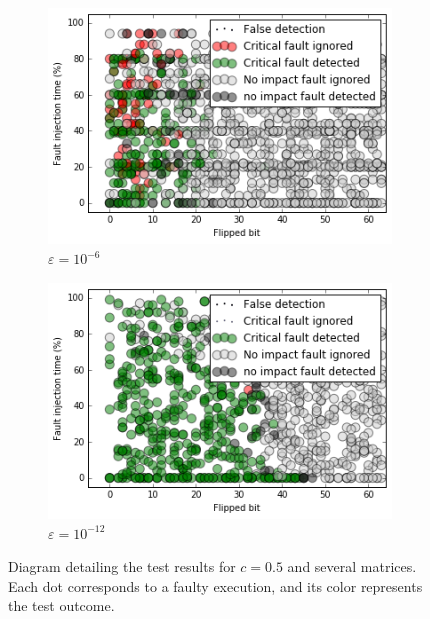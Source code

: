 \documentclass[twoside]{article}
\newcounter{fig}\setcounter{fig}{0}
\begin{document}
\begin{figure}[H]
\begin{minipage}[b]{0.48\linewidth}
      \begin{subfigure}[t]{\linewidth}
        \centering
        \includegraphics[width=1.1\linewidth]{figures/test_result_c05_0_precond.png}
        \caption{$\varepsilon = 10^{-6}$}\label{fig:test_result_c05_0_precond}	
      \end{subfigure}
      \quad
      \begin{subfigure}[t]{\linewidth}
        \centering
        \includegraphics[width=1.1\linewidth]{figures/test_result_c05_1_precond.png}
        \caption{$\varepsilon = 10^{-12}$}\label{fig:test_result_c05_1_precond}	
      \end{subfigure}

    \end{minipage}
    \caption{Diagram detailing the test results for $c = 0.5$ and several matrices. Each dot corresponds to a faulty execution, and its color represents the test outcome.}
    \label{fig:test_result_c05_matrices}
  \end{figure}
\end{document}
